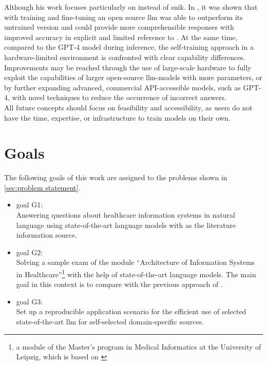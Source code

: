 Although his work focuses particularly on \citet{bb2} instead of \ac{snik}.
%
In \citet{Paul_Keller}, it was shown that with training and fine-tuning an open source \ac{llm} was able to outperform its untrained version and could provide more comprehensible responses with improved accuracy in explicit and limited reference to \citet{bb2}.
At the same time, compared to the GPT-4 model during inference, the self-training approach in a hardware-limited environment is confronted with clear capability differences.
%
Improvements may be reached through the use of large-scale hardware to fully exploit the capabilities of larger open-source \ac{llm}-models with more parameters, or by further expanding advanced, commercial API-accessible models, such as GPT-4, with novel techniques to reduce the occurrence of incorrect answers.\\
%
All future concepts should focus on feasibility and accessibility, as users do not have the time, expertise, or infrastructure to train models on their own.

\section{Goals}\label{sec:goals}
The following goals of this work are assigned to the problems shown in \cref{sec:problem statement}.
\begin{itemize}
  \item goal G1:\\
    Answering questions about healthcare information systems in natural language using state-of-the-art language models with \citet{bb2} as the literature information source. 
  \item goal G2:\\
   Solving a sample exam of the module \enquote{Architecture of Information Systems in Healthcare}\footnote{\raggedright{}a module of the Master's program in Medical Informatics at the University of Leipzig, which is based on \citet{bb2}} with the help of state-of-the-art language models.
   The main goal in this context is to compare with the previous approach of \citet{Paul_Keller} .
   \item goal G3:\\
   Set up a reproducible application scenario for the efficient use of selected state-of-the-art \ac{llm} for self-selected domain-specific sources.
\end{itemize}
